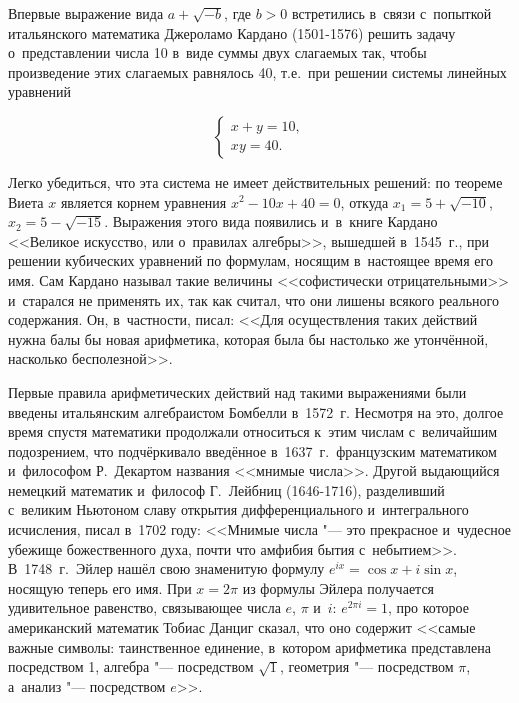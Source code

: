 
Впервые выражение вида $a + \sqrt{-b}$, где $b > 0$ встретились в~связи
с~попыткой итальянского математика Джероламо Кардано (1501-1576) решить
задачу о~представлении числа 10 в~виде суммы двух слагаемых так, чтобы
произведение этих слагаемых равнялось 40, т.е.\ при решении системы линейных
уравнений

\begin{equation*}
\begin{cases}
x + y = 10, \\
xy = 40.
\end{cases}
\end{equation*}

\noindent
Легко убедиться, что эта система не имеет действительных решений:
по теореме Виета $x$ является корнем уравнения $x^{2} - 10x + 40 = 0$,
откуда $x_{1} = 5 + \sqrt{-10}$, $x_{2} = 5 - \sqrt{-15}$.
Выражения этого вида появились и~в~книге Кардано <<Великое искусство,
или о~правилах алгебры>>, вышедшей в~1545~г., при решении кубических
уравнений по формулам, носящим в~настоящее время его имя. Сам Кардано
называл такие величины <<софистически отрицательными>> и~старался не
применять их, так как считал, что они лишены всякого реального содержания.
Он, в~частности, писал: <<Для осуществления таких действий нужна балы
бы новая арифметика, которая была бы настолько же утончённой, насколько
бесполезной>>.

Первые правила арифметических действий над такими выражениями были введены
итальянским алгебраистом Бомбелли в~1572~г. Несмотря на это, долгое время
спустя математики продолжали относиться к~этим числам с~величайшим
подозрением, что подчёркивало введённое в~1637~г.\ французским математиком
и~философом Р.~Декартом названия <<мнимые числа>>. Другой выдающийся
немецкий математик и~философ Г.~Лейбниц (1646-1716), разделивший с~великим
Ньютоном славу открытия дифференциального и~интегрального исчисления, писал
в~1702 году: <<Мнимые числа "--- это прекрасное и~чудесное убежище
божественного духа, почти что амфибия бытия с~небытием>>.
В~1748~г.\ Эйлер нашёл свою знаменитую формулу
$e^{ix} = \cos x + i\sin x$, носящую теперь его имя. При $x = 2\pi$
из формулы Эйлера получается удивительное равенство, связывающее числа
$e$, $\pi$ и~$i$: $e^{2\pi i} = 1$, про которое американский математик
Тобиас Данциг сказал, что оно содержит <<самые важные символы: таинственное
единение, в~котором арифметика представлена посредством 1,
алгебра "--- посредством $\sqrt{1}$, геометрия "--- посредством $\pi$,
а~анализ "--- посредством $e$>>. 

